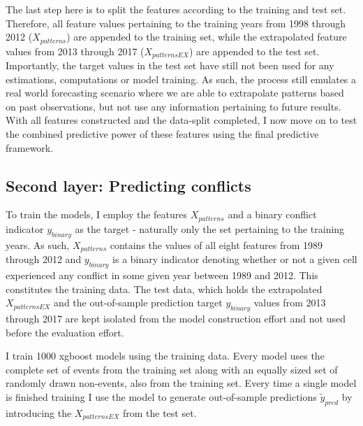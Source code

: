 \documentclass[a4paper]{article}
\begin{document}
The last step here is to split the features according to the training and test set. Therefore, all feature values pertaining to the training years from 1998 through 2012 ($X_{patterns}$) are appended to the training set, while the extrapolated feature values from 2013 through 2017 ($X_{patternsEX}$) are appended to the test set. Importantly, the target values in the test set have still not been used for any estimations, computations or model training. As such, the process still emulates a real world forecasting scenario where we are able to extrapolate patterns based on past observations, but not use any information pertaining to future results. With all features constructed and the data-split completed, I now move on to test the combined predictive power of these features using the final predictive framework.\par

\subsection{Second layer: Predicting conflicts}


To train the models, I employ the features $X_{patterns}$ and a binary conflict indicator $y_{binary}$ as the target - naturally only the set pertaining to the training years. As such, $X_{patterns}$ contains the values of all eight features from 1989 through 2012 and $y_{binary}$ is a binary indicator denoting whether or not a given cell experienced any conflict in some given year between 1989 and 2012. This constitutes the training data. The test data, which holds the extrapolated $X_{patternsEX}$ and the out-of-sample prediction target $y_{binary}$ values from 2013 through 2017 are kept isolated from the model construction effort and not used before the evaluation effort.\par

I train 1000 xgboost models using the training data. Every model uses the complete set of events from the training set along with an equally sized set of randomly drawn non-events, also from the training set. Every time a single model is finished training I use the model to generate out-of-sample predictions $\tilde{y}_{pred}$ by introducing the $X_{patternsEX}$ from the test set.\par
\end{document}
